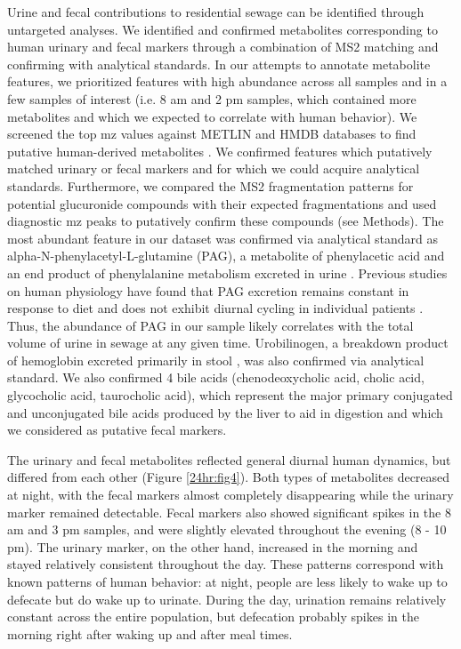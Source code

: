 Urine and fecal contributions to residential sewage can be identified through untargeted analyses. We identified and confirmed metabolites corresponding to human urinary and fecal markers through a combination of MS2 matching and confirming with analytical standards. In our attempts to annotate metabolite features, we prioritized features with high abundance across all samples and in a few samples of interest (i.e. 8 am and 2 pm samples, which contained more metabolites and which we expected to correlate with human behavior). We screened the top mz values against METLIN and HMDB databases to find putative human-derived metabolites \cite{Wishart2012,Smith2005}. We confirmed features which putatively matched urinary or fecal markers and for which we could acquire analytical standards. Furthermore, we compared the MS2 fragmentation patterns for potential glucuronide compounds with their expected fragmentations and used diagnostic mz peaks to putatively confirm these compounds (see Methods). The most abundant feature in our dataset was confirmed via analytical standard as alpha-N-phenylacetyl-L-glutamine (PAG), a metabolite of phenylacetic acid and an end product of phenylalanine metabolism excreted in urine \cite{Seakins1971,Stein1954}. Previous studies on human physiology have found that PAG excretion remains constant in response to diet and does not exhibit diurnal cycling in individual patients \cite{Seakins1971}. Thus, the abundance of PAG in our sample likely correlates with the total volume of urine in sewage at any given time. Urobilinogen, a breakdown product of hemoglobin excreted primarily in stool \cite{Balikov1957}, was also confirmed via analytical standard. We also confirmed 4 bile acids (chenodeoxycholic acid, cholic acid, glycocholic acid, taurocholic acid), which represent the major primary conjugated and unconjugated bile acids produced by the liver to aid in digestion and which we considered as putative fecal markers.

The urinary and fecal metabolites reflected general diurnal human dynamics, but differed from each other (Figure \ref{24hr:fig4}). Both types of metabolites decreased at night, with the fecal markers almost completely disappearing while the urinary marker remained detectable. Fecal markers also showed significant spikes in the 8 am and 3 pm samples, and were slightly elevated throughout the evening (8 - 10 pm). The urinary marker, on the other hand, increased in the morning and stayed relatively consistent throughout the day. These patterns correspond with known patterns of human behavior: at night, people are less likely to wake up to defecate but do wake up to urinate. During the day, urination remains relatively constant across the entire population, but defecation probably spikes in the morning right after waking up and after meal times.

